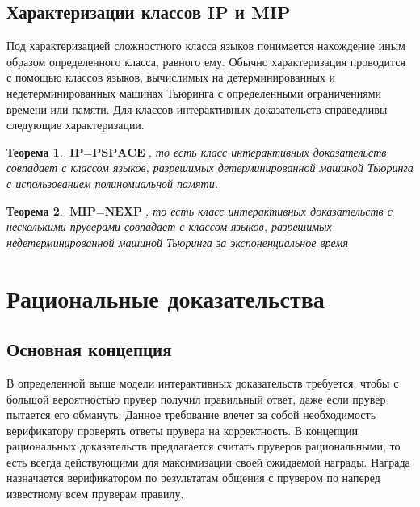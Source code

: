\documentclass[14pt, a4paper]{extreport}
\newtheorem{theorem}{\indent Теорема}
\begin{document}
\section{Характеризации классов $\textbf{IP}$ и $\textbf{MIP}$}
Под характеризацией сложностного класса языков понимается нахождение иным образом определенного класса, равного ему. Обычно характеризация проводится с помощью классов языков, вычислимых на детерминированных и недетерминированных машинах Тьюринга с определенными ограничениями времени или памяти. Для классов интерактивных доказательств справедливы следующие характеризации.
\begin{theorem}$\textbf{IP} = \textbf{PSPACE}$, то есть класс интерактивных доказательств совпадает с классом языков, разрешимых детерминированной машиной Тьюринга с использованием полиномиальной памяти.~\cite{shamir1992ip}
\end{theorem}
\begin{theorem}$\textbf{MIP} = \textbf{NEXP}$, то есть класс интерактивных доказательств с несколькими пруверами совпадает с классом языков, разрешимых недетерминированной машиной Тьюринга за экспоненциальное время~\cite{babai1991mip}\end{theorem}

\chapter{Рациональные доказательства}
\section{Основная концепция}
В определенной выше модели интерактивных доказательств требуется, чтобы с большой вероятностью прувер получил правильный ответ, даже если прувер пытается его обмануть. Данное требование влечет за собой необходимость верификатору проверять ответы прувера на корректность. В концепции рациональных доказательств предлагается считать пруверов рациональными, то есть всегда действующими для максимизации своей ожидаемой награды. Награда назначается верификатором по результатам общения с прувером по наперед известному всем пруверам правилу. 
\end{document}
